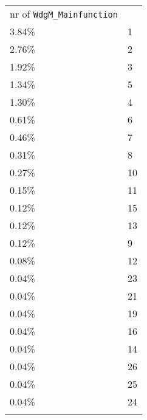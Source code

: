 \begin{longtable}{l l}
nr of \verb!WdgM_Mainfunction!\\
3.84\% & 1\\
2.76\% & 2\\
1.92\% & 3\\
1.34\% & 5\\
1.30\% & 4\\
0.61\% & 6\\
0.46\% & 7\\
0.31\% & 8\\
0.27\% & 10\\
0.15\% & 11\\
0.12\% & 15\\
0.12\% & 13\\
0.12\% & 9\\
0.08\% & 12\\
0.04\% & 23\\
0.04\% & 21\\
0.04\% & 19\\
0.04\% & 16\\
0.04\% & 14\\
0.04\% & 26\\
0.04\% & 25\\
0.04\% & 24\\\\


\end{longtable}
